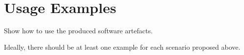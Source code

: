 \section{Usage Examples}

Show how to use the produced software artefacts.

Ideally, there should be at least one example for each scenario proposed above.